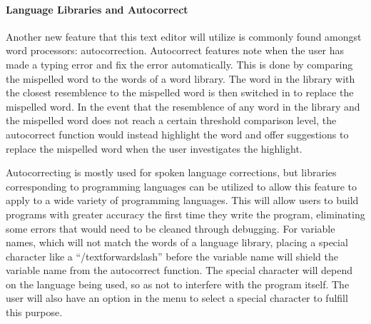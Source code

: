 \documentclass[11pt, oneside]{article}
\begin{document}
\paragraph{Language Libraries and Autocorrect}
Another new feature that this text editor will utilize is commonly found amongst word processors: autocorrection. Autocorrect features note when the user has made a typing error and fix the error automatically. This is done by comparing the mispelled word to the words of a word library. The word in the library with the closest resemblence to the mispelled word is then switched in to replace the mispelled word. In the event that the resemblence of any word in the library and the mispelled word does not reach a certain threshold comparison level, the autocorrect function would instead highlight the word and offer suggestions to replace the mispelled word when the user investigates the highlight. 

Autocorrecting is mostly used for spoken language corrections, but libraries corresponding to programming languages can be utilized to allow this feature to apply to a wide variety of programming languages. This will allow users to build programs with greater accuracy the first time they write the program, eliminating some errors that would need to be cleaned through debugging. For variable names, which will not match the words of a language library, placing a special character like a ``/textforwardslash'' before the variable name will shield the variable name from the autocorrect function. The special character will depend on the language being used, so as not to interfere with the program itself. The user will also have an option in the menu to select a special character to fulfill this purpose.
\end{document}

